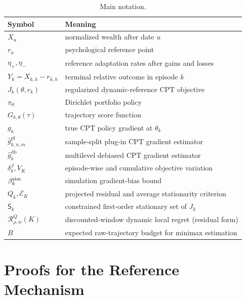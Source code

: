 \documentclass[11pt]{article}
\newcommand{\1}{\mathbf 1}
\newcommand{\CPT}{\ensuremath{\mathrm{CPT}}\xspace}
\newcommand{\Reg}{\mathcal R}
\newcommand{\Sta}{\mathsf S}
\newcommand{\etaP}{\eta_{+}}
\newcommand{\etaM}{\eta_{-}}
\newcommand{\db}{\mathrm{db}}
\newcommand{\pl}{\mathrm{pl}}
\begin{document}
\begin{table}[h]
\centering
\caption{Main notation.}\label{tab:notation}
\begin{tabular}{ll}
\toprule
Symbol & Meaning \\
\midrule
$X_u$ & normalized wealth after date $u$ \\
$r_u$ & psychological reference point \\
$\etaP,\etaM$ & reference adaptation rates after gains and losses \\
$Y_k=X_{k,h}-r_{k,h}$ & terminal relative outcome in episode $k$ \\
$J_k(\theta,r_k)$ & regularized dynamic-reference \CPT objective \\
$\pi_\theta$ & Dirichlet portfolio policy \\
$G_{k,\theta}(\tau)$ & trajectory score function \\
$g_k$ & true \CPT policy gradient at $\theta_k$ \\
$\widehat g_{k,n,m}^{\pl}$ & sample-split plug-in \CPT gradient estimator \\
$\widehat g_k^{\db}$ & multilevel debiased \CPT gradient estimator \\
$\delta_k^J,V_K$ & episode-wise and cumulative objective variation \\
$\beta_k^{\rm sim}$ & simulation gradient-bias bound \\
$Q_k,\mathcal E_K$ & projected residual and average stationarity criterion \\
$\Sta_k$ & constrained first-order stationary set of $J_k$ \\
$\Reg_{\rho,w}^{Q}(K)$ & discounted-window dynamic local regret (residual form) \\
$B$ & expected raw-trajectory budget for minimax estimation \\
\bottomrule
\end{tabular}
\end{table}

\section{Proofs for the Reference Mechanism}\label{app:reference-proofs}
\end{document}

